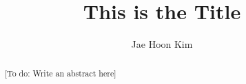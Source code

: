 \documentclass[draft,dvipsnames]{drexel-thesis}
\author{Jae Hoon Kim}
\title{This is the Title}
\begin{document}
\begin{preamble}



\tableofcontents
\listoftables
\listoffigures


\begin{abstract}
{\color{blue}[To do: Write an abstract here]}
\end{abstract}
\end{preamble}
\end{document}
